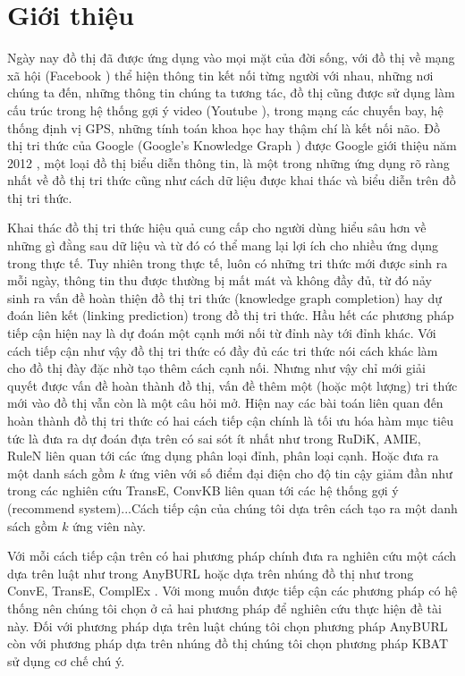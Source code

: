 \chapter{Giới thiệu}
\label{chap:Introduction}

Ngày nay đồ thị đã được ứng dụng vào mọi mặt của đời sống, với đồ thị về mạng xã hội (Facebook \cite{ugander2011anatomy}) thể hiện thông tin kết nối từng người với nhau, những nơi chúng ta đến, những thông tin chúng ta tương tác, đồ thị cũng được sử dụng làm cấu trúc trong hệ thống gợi ý video (Youtube \cite{baluja2008video}), trong mạng các chuyến bay, hệ thống định vị GPS, những tính toán khoa học hay thậm chí là kết nối não. Đồ thị tri thức của Google (Google's Knowledge Graph \cite{googlekg:2020}) được Google giới thiệu năm 2012 \cite{ji2020survey}, một loại đồ thị biểu diễn thông tin, là một trong những ứng dụng rõ ràng nhất về đồ thị tri thức cũng như cách dữ liệu được khai thác và biểu diễn trên đồ thị tri thức.

Khai thác đồ thị tri thức hiệu quả cung cấp cho người dùng hiểu sâu hơn về những gì đằng sau dữ liệu và từ đó có thể mang lại lợi ích cho nhiều ứng dụng trong thực tế. Tuy nhiên trong thực tế, luôn có những tri thức mới được sinh ra mỗi ngày, thông tin thu được thường bị mất mát và không đầy đủ, từ đó nảy sinh ra vấn đề hoàn thiện đồ thị tri thức (knowledge graph completion) hay dự đoán liên kết (linking prediction) trong đồ thị tri thức.
Hầu hết các phương pháp tiếp cận hiện nay là dự đoán một cạnh mới nối từ đỉnh này tới đỉnh khác. Với cách tiếp cận như vậy đồ thị tri thức có đầy đủ các tri thức nói cách khác làm cho đồ thị đày đặc nhờ tạo thêm cách cạnh nối. Nhưng như vậy chỉ mới giải quyết được vấn đề hoàn thành đồ thị, vấn đề thêm một (hoặc một lượng) tri thức mới vào đồ thị vẫn còn là một câu hỏi mở. Hiện nay các bài toán liên quan đến hoàn thành đồ thị tri thức có hai cách tiếp cận chính là tối ưu hóa hàm mục tiêu tức là đưa ra dự đoán đựa trên có sai sót ít nhất như trong RuDiK\cite{ortona2018robust}, AMIE\cite{galarraga2015fast}, RuleN\cite{meilicke2018fine} liên quan tới các ứng dụng phân loại đỉnh, phân loại cạnh. Hoặc đưa ra một danh sách gồm \(k\) ứng viên với số điểm đại điện cho độ tin cậy giảm đần như trong các nghiên cứu TransE\cite{bordes2013translating}, ConvKB\cite{vu2019capsule} liên quan tới các hệ thống gợi ý (recommend system)...Cách tiếp cận của chúng tôi dựa trên cách tạo ra một danh sách gồm \(k\) ứng viên này.

Với mỗi cách tiếp cận trên có hai phương pháp chính đưa ra nghiên cứu một cách dựa trên luật như trong AnyBURL\cite{burl} hoặc dựa trên nhúng đồ thị như trong ConvE\cite{dettmers2017convolutional}, TransE\cite{bordes2013translating}, ComplEx \cite{trouillon2016complex}. Với mong muốn được tiếp cận các phương pháp có hệ thống nên chúng tôi chọn ở cả hai phương pháp để nghiên cứu thực hiện đề tài này. Đối với phương pháp dựa trên luật chúng tôi chọn phương pháp AnyBURL\cite{burl} còn với phương pháp dựa trên nhúng đồ thị chúng tôi chọn phương pháp KBAT \cite{nathani2019learning} sử dụng cơ chế chú  ý.


